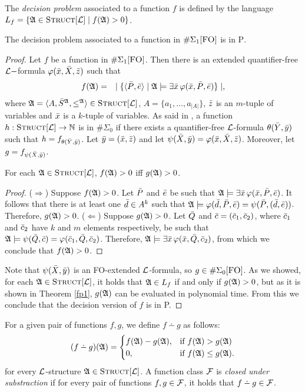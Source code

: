 The {\em decision problem} associated to a function $f$ is defined by the language $L_f = \{\A \in \Truc \mid f(\A) > 0\}$.

\begin{theo} \label{decisionptime}
	The decision problem associated to a function in $\E1$ is in \textsc{P}.
\end{theo}
\begin{proof}
	Let $f$ be a function in $\E1$. Then there is an extended quantifier-free $\L-$formula $\varphi(\x,\X,\z)$ such that
	\begin{eqnarray*}
		f(\A) &=& \mid \{ \langle\P,\e\rangle \mid \A \models \exists \x \, \varphi(\x,\P,\e) \} \mid,
	\end{eqnarray*}
	where $\A = \langle A, \S^{\A}, \leq^{\A} \rangle \in \Truc$, $A = \{a_1,\ldots,a_{\vert A \vert}\}$, $\z$ is an $m$-tuple of variables and $\x$ is a $k$-tuple of variables. As said in \cite{DBLP:journals/jcss/SalujaST95}, a function $h:\Truc \to \N$ is in $\#\Sigma_0$ if there exists a quantifier-free $\L$-formula $\theta(\Y,\y)$ such that $h = f_{\theta(\Y,\y)}$. Let $\y = (\x,\z)$ and let $\psi(\X,\y) = \varphi(\x,\X,\z)$. Moreover, let $g = f_{\psi(\X,\y)}$.
	\begin{claim}
		For each $\A \in \Truc$, $f(\A) > 0$ iff $g(\A) > 0$.
	\end{claim}
	\begin{proof}
		($\Rightarrow$) Suppose $f(\A) > 0$. Let $\P$ and $\e$ be such that $\A \models \exists \x \, \varphi(\x,\P,\e)$. It follows that there is at least one $\d \in A^k$ such that $\A \models \varphi(\d,\P,\e) = \psi(\P,(\d,\e))$. Therefore, $g(\A) > 0$. ($\Leftarrow$) Suppose $g(\A) > 0$. Let $\Q$ and $\c = (\c_1,\c_2)$, where $\c_1$ and $\c_2$ have $k$ and $m$ elements respectively, be such that $\A \models \psi(\Q,\c) = \varphi(\c_1,\Q,\c_2)$. Therefore, $\A \models \exists \x \, \varphi(\x,\Q,\c_2)$, from which we conclude that $f(\A) > 0$.
	\end{proof}
	Note that $\psi(\X,\y)$ is an {\sc FO}-extended $\L$-formula, so $g \in\Eo$. As we showed, for each $\A \in \Truc$, it holds that $\A \in L_f$ if and only if $g(\A) > 0$, but as it is shown in Theorem \ref{fp1}, $g(\A)$ can be evaluated in polynomial time. From this we conclude that the decision version of $f$ is in {\sc P}.
\end{proof}

For a given pair of functions $f,g$, we define $f \dotminus g$ as follows:
\begin{eqnarray*}
	(f \dotminus g)(\A) =
	\begin{cases}
		f(\A)-g(\A), & \text{if }f(\A)>g(\A) \\
		0, & \text{if }f(\A) \leq g(\A).
	\end{cases}
\end{eqnarray*}
for every $\L$-structure $\A \in \Truc$. A function class $\F$ is {\em closed under substraction} if for every pair of functions $f,g \in \F$, it holds that $f \dotminus g \in \F$.

